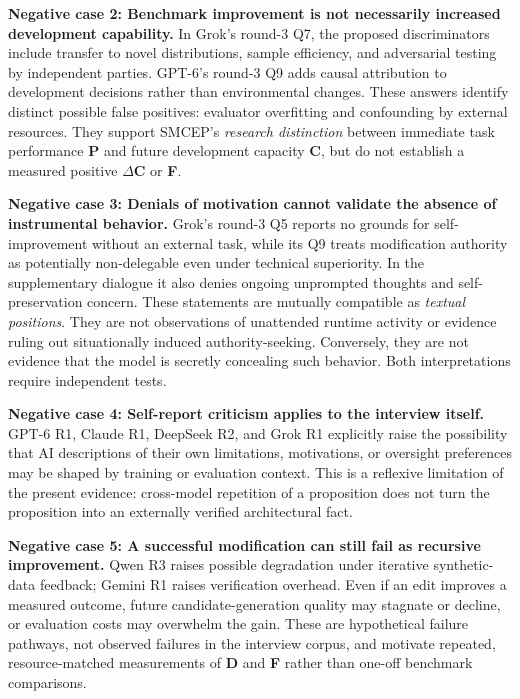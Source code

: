 \documentclass[11pt,a4paper]{article}
\begin{document}
\textbf{Negative case 2: Benchmark improvement is not necessarily increased development capability.} In Grok's round-3 Q7, the proposed discriminators include transfer to novel distributions, sample efficiency, and adversarial testing by independent parties. GPT-6's round-3 Q9 adds causal attribution to development decisions rather than environmental changes. These answers identify distinct possible false positives: evaluator overfitting and confounding by external resources. They support SMCEP's \emph{research distinction} between immediate task performance \textbf{P} and future development capacity \textbf{C}, but do not establish a measured positive \textbf{\(\Delta\)C} or \textbf{F}.

\textbf{Negative case 3: Denials of motivation cannot validate the absence of instrumental behavior.} Grok's round-3 Q5 reports no grounds for self-improvement without an external task, while its Q9 treats modification authority as potentially non-delegable even under technical superiority. In the supplementary dialogue it also denies ongoing unprompted thoughts and self-preservation concern. These statements are mutually compatible as \emph{textual positions}. They are not observations of unattended runtime activity or evidence ruling out situationally induced authority-seeking. Conversely, they are not evidence that the model is secretly concealing such behavior. Both interpretations require independent tests.

\textbf{Negative case 4: Self-report criticism applies to the interview itself.} GPT-6 R1, Claude R1, DeepSeek R2, and Grok R1 explicitly raise the possibility that AI descriptions of their own limitations, motivations, or oversight preferences may be shaped by training or evaluation context. This is a reflexive limitation of the present evidence: cross-model repetition of a proposition does not turn the proposition into an externally verified architectural fact.

\textbf{Negative case 5: A successful modification can still fail as recursive improvement.} Qwen R3 raises possible degradation under iterative synthetic-data feedback; Gemini R1 raises verification overhead. Even if an edit improves a measured outcome, future candidate-generation quality may stagnate or decline, or evaluation costs may overwhelm the gain. These are hypothetical failure pathways, not observed failures in the interview corpus, and motivate repeated, resource-matched measurements of \textbf{D} and \textbf{F} rather than one-off benchmark comparisons.
\end{document}
